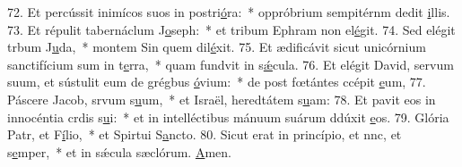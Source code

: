72. Et percússit inimícos suos in postri\uline{ó}ra:~* oppróbrium sempitérnm dedit \uline{i}llis.
73. Et répulit tabernáclum J\uline{o}seph:~* et tribum Ephram non el\uline{é}git.
74. Sed elégit trbum J\uline{u}da,~* montem Sin quem dil\uline{é}xit.
75. Et ædificávit sicut unicórnium sanctifícium sum in t\uline{e}rra,~* quam fundvit in s\uline{ǽ}cula.
76. Et elégit David, servum suum, et sústulit eum de grégbus \uline{ó}vium:~* de post fœtántes ccépit \uline{e}um,
77. Páscere Jacob, srvum s\uline{u}um,~* et Israël, heredtátem s\uline{u}am:
78. Et pavit eos in innocéntia crdis s\uline{u}i:~* et in intelléctibus mánuum suárum ddúxit \uline{e}os.
79. Glória Patr, et F\uline{í}lio,~* et Spirtui S\uline{a}ncto.
80. Sicut erat in princípio, et nnc, et s\uline{e}mper,~* et in sǽcula sæclórum. \uline{A}men.
